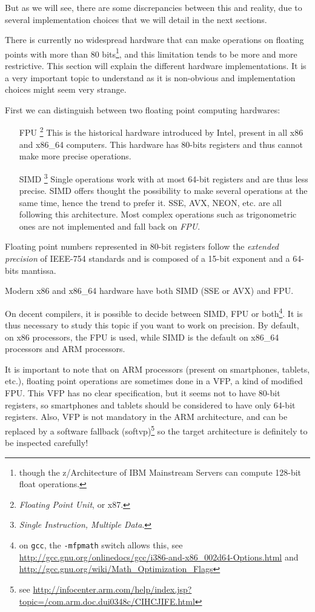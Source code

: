 But as we will see, there are some discrepancies between this and reality, due to several implementation choices that we will detail in the next sections.


There is currently no widespread hardware that can make operations on floating points with more than 80 bits\footnote{though the z/Architecture of IBM Mainstream Servers can compute 128-bit float operations.}, and this limitation tends to be more and more restrictive. This section will explain the different hardware implementations. It is a very important topic to understand as it is non-obvious and implementation choices might seem very strange.

First we can distinguish between two floating point computing hardwares:
\begin{enumerate}
\item[FPU]\footnote{\emph{Floating Point Unit}, or x87.} This is the historical hardware introduced by Intel, present in all x86 and x86\_64 computers. This hardware has 80-bits registers and thus cannot make more precise operations.
\item[SIMD]\footnote{\emph{Single Instruction, Multiple Data}.} Single operations work with at most 64-bit registers and are thus less precise. SIMD offers thought the possibility to make several operations at the same time, hence the trend to prefer it. SSE, AVX, NEON, etc. are all following this architecture. Most complex operations such as trigonometric ones are not implemented and fall back on \emph{FPU}.
\end{enumerate}

Floating point numbers represented in 80-bit registers follow the \emph{extended precision} of IEEE-754 standards and is composed of a 15-bit exponent and a 64-bits mantissa.

Modern x86 and x86\_64 hardware have both SIMD (SSE or AVX) and FPU.

On decent compilers, it is possible to decide between SIMD, FPU or both\footnote{on \texttt{gcc}, the \texttt{-mfpmath} switch allows this, see \url{http://gcc.gnu.org/onlinedocs/gcc/i386-and-x86_002d64-Options.html} and \url{http://gcc.gnu.org/wiki/Math_Optimization_Flags}}. It is thus necessary to study this topic if you want to work on precision. By default, on x86 processors, the FPU is used, while SIMD is the default on x86\_64 processors and ARM processors.

It is important to note that on ARM processors (present on smartphones, tablets, etc.), floating point operations are sometimes done in a VFP, a kind of modified FPU. This VFP has no clear specification, but it seems not to have 80-bit registers, so smartphones and tablets should be considered to have only 64-bit registers. Also, VFP is not mandatory in the ARM architecture, and can be replaced by a software fallback (softvp)\footnote{see \url{http://infocenter.arm.com/help/index.jsp?topic=/com.arm.doc.dui0348c/CIHCJIFE.html}} so the target architecture is definitely to be inspected carefully!

